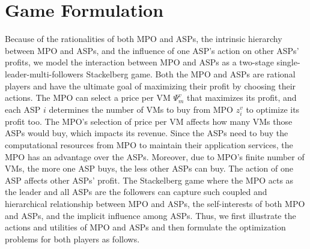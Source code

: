 \documentclass[10pt,journal, compsoc]{IEEEtran}
\begin{document}
\section{Game Formulation}\label{sec:game_formulations}
Because of the rationalities of both MPO and ASPs, the intrinsic hierarchy between MPO and ASPs, and the influence of one ASP's action on other ASPs' profits, we model the interaction between MPO and ASPs as a two-stage single-leader-multi-followers Stackelberg game. Both the MPO and ASPs are rational players and have the ultimate goal of maximizing their profit by choosing their actions. The MPO can select a price per VM $\Psi_{m}^v$ that maximizes its profit, and each ASP $i$ determines the number of VMs to buy from MPO $z_i^v$ to optimize its profit too. The MPO's selection of price per VM affects how many VMs those ASPs would buy, which impacts its revenue. Since the ASPs need to buy the computational resources from MPO to maintain their application services, the MPO has an advantage over the ASPs. Moreover, due to MPO's finite number of VMs, the more one ASP buys, the less other ASPs can buy. The action of one ASP affects other ASPs' profit. The Stackelberg game where the MPO acts as the leader and all ASPs are the followers can capture such coupled and hierarchical relationship between MPO and ASPs, the self-interests of both MPO and ASPs, and the implicit influence among ASPs. Thus, we first illustrate the actions and utilities of MPO and ASPs and then formulate the optimization problems for both players as follows.
\end{document}
